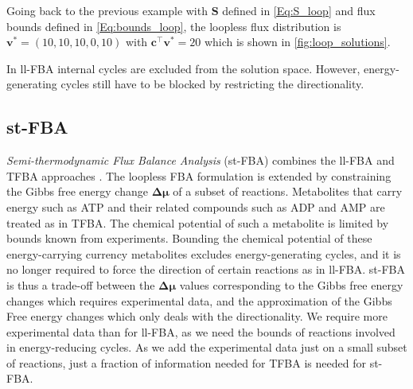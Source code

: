 
Going back to the previous example with $\mathbf S$ defined in \cref{Eq:S_loop} and flux bounds defined in \cref{Eq:bounds_loop},  
the loopless flux distribution is $\mathbf v^* = (10,10,10,0,10)$ with $\mathbf c^\intercal \mathbf v^* = 20$ which is shown in \cref{fig:loop_solutions}. 

In \textsf{ll-FBA} internal cycles are excluded from the solution space. However, energy-generating cycles still have to be blocked by restricting the directionality.

\subsection{st-FBA} \label{section:st_fba}
\textit{Semi-thermodynamic Flux Balance Analysis} (st-FBA) combines the \textsf{ll-FBA} and \textsf{TFBA} approaches \cite{noor_removing_2018}. The loopless FBA formulation is extended by constraining the Gibbs free energy change $\boldsymbol{\Delta \mu}$ of a subset of reactions. Metabolites that carry energy such as ATP and their related compounds such as ADP and AMP are treated as in \textsf{TFBA}. The chemical potential of such a metabolite is limited by bounds known from experiments. Bounding the chemical potential of these energy-carrying currency metabolites excludes energy-generating cycles, and it is no longer required to force the direction of certain reactions as in ll-FBA. 
\textsf{st-FBA} is thus a trade-off between the $\boldsymbol{\Delta \mu}$ values corresponding to the Gibbs free energy changes which requires experimental data, and the approximation of the Gibbs Free energy changes which only deals with the directionality.
We require more experimental data than for ll-FBA, as we need the bounds of reactions involved in energy-reducing cycles. As we add the experimental data just on a small subset of reactions, just a fraction of information needed for \textsf{TFBA} is needed for \textsf{st-FBA}.

